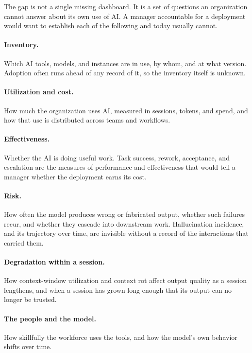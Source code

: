 \documentclass[11pt]{article}
\begin{document}
The gap is not a single missing dashboard. It is a set of questions an
organization cannot answer about its own use of AI. A manager accountable for a
deployment would want to establish each of the following and today usually
cannot.

\paragraph{Inventory.} Which AI tools, models, and instances are in use, by whom,
and at what version. Adoption often runs ahead of any record of it, so the
inventory itself is unknown.

\paragraph{Utilization and cost.} How much the organization uses AI, measured in
sessions, tokens, and spend, and how that use is distributed across teams and
workflows.

\paragraph{Effectiveness.} Whether the AI is doing useful work. Task success,
rework, acceptance, and escalation are the measures of performance and
effectiveness that would tell a manager whether the deployment earns its cost.

\paragraph{Risk.} How often the model produces wrong or fabricated output,
whether such failures recur, and whether they cascade into downstream work.
Hallucination incidence, and its trajectory over time, are invisible without a
record of the interactions that carried them.

\paragraph{Degradation within a session.} How context-window utilization and
context rot affect output quality as a session lengthens, and when a session has
grown long enough that its output can no longer be trusted.

\paragraph{The people and the model.} How skillfully the workforce uses the
tools, and how the model's own behavior shifts over time.
\end{document}

